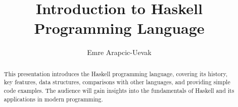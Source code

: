 \documentclass[a4paper, 10pt]{article}
\title{Introduction to Haskell Programming Language}
\author{Emre Arapcic-Uevak}
\date{}
\begin{document}
	\maketitle
    \lstset{language=Haskell}
	\vspace{5mm}
	
	\begin{abstract}
		\begin{center}
            \begin{spacing}{1.0}
                This presentation introduces the Haskell programming language, covering its history, key features, data structures, comparisons with other languages, and providing simple code examples. The audience will gain insights into the fundamentals of Haskell and its applications in modern programming.
            \end{spacing}
		\end{center}
	\end{abstract}


	\newpage %

	\tableofcontents
	\pagebreak

\end{document}
